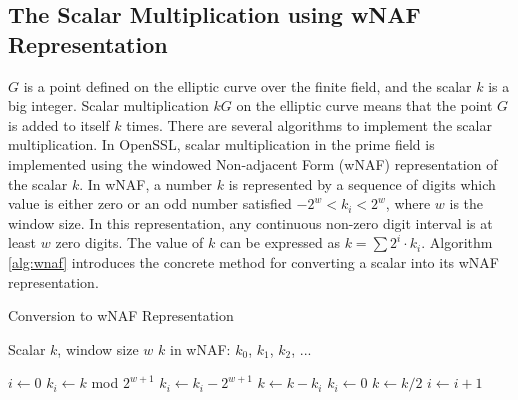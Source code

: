 

\subsection{The Scalar Multiplication using wNAF Representation}
\label{intro_wnaf}
$G$ is a point defined on the elliptic curve over the finite field,
 and the scalar $k$ is a big integer.
Scalar multiplication $kG$ on the elliptic curve means that the point $G$ is added to itself $k$ times.
There are several algorithms to implement the scalar multiplication.
In OpenSSL, scalar multiplication in the prime field is implemented using the windowed Non-adjacent Form (wNAF) representation \cite{GORDON1998129,Miyaji1997,Koyama1002,Solinas2000} of the scalar $k$.
In wNAF, a number $k$ is represented by a sequence of digits which value is either zero or an odd number satisfied $-2^{w} < k_{i} < 2^{w}$,
 where $w$ is the window size. In this representation, any continuous non-zero digit interval is at least $w$ zero digits.
The value of $k$ can be expressed as $k = \sum{2^{i}\cdot k_{i}}$.
Algorithm \ref{alg:wnaf} introduces the concrete method for converting a scalar into its wNAF representation.

\renewcommand{\algorithmicrequire}{\textbf{Input:}}
\renewcommand{\algorithmicensure}{\textbf{Output:}}

 \begin{algorithm}[t]
        \caption{Conversion to wNAF Representation}
        \label{alg:wnaf}
        \begin{algorithmic}[1]
            \Require Scalar $k$, window size $w$
            \Ensure $k$ in wNAF: $k_0$, $k_1$, $k_2$, ...

            \State $i \gets 0$
                    \State $k_i \gets k$ mod $2^{w+1}$
                        \State $k_{i} \gets k_{i} - 2^{w+1}$
                    \EndIf
                    \State $k \gets k - k_{i}$
                \Else
                    \State $k_{i} \gets 0 $
                \EndIf
                \State $k \gets k/2 $
                \State $i \gets i+1 $
            \EndWhile
        \end{algorithmic}
    \end{algorithm}


